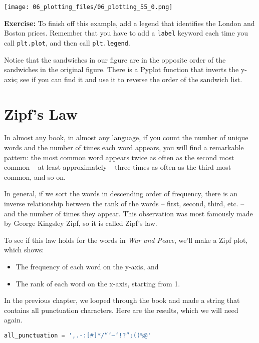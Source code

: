 \begin{center}
\texttt{[image: 06\_plotting\_files/06\_plotting\_55\_0.png]}
\end{center}

\textbf{Exercise:} To finish off this example, add a legend that
identifies the London and Boston prices. Remember that you have to add a
\passthrough{\lstinline!label!} keyword each time you call
\passthrough{\lstinline!plt.plot!}, and then call
\passthrough{\lstinline!plt.legend!}.

Notice that the sandwiches in our figure are in the opposite order of
the sandwiches in the original figure. There is a Pyplot function that
inverts the y-axis; see if you can find it and use it to reverse the
order of the sandwich list.

\section{Zipf's Law}\label{zipfs-law}

In almost any book, in almost any language, if you count the number of
unique words and the number of times each word appears, you will find a
remarkable pattern: the most common word appears twice as often as the
second most common -- at least approximately -- three times as often as
the third most common, and so on.

In general, if we sort the words in descending order of frequency, there
is an inverse relationship between the rank of the words -- first,
second, third, etc. -- and the number of times they appear. This
observation was most famously made by George Kingsley Zipf, so it is
called Zipf's law.

\pagebreak

To see if this law holds for the words in \emph{War and Peace}, we'll
make a Zipf plot, which shows:

\begin{itemize}
\item
  The frequency of each word on the y-axis, and
\item
  The rank of each word on the x-axis, starting from 1.
\end{itemize}

In the previous chapter, we looped through the book and made a string
that contains all punctuation characters. Here are the results, which we
will need again.

\begin{lstlisting}[language=Python,style=source]
all_punctuation = ',.-:[#]*/“’—‘!?”;()%@'
\end{lstlisting}

